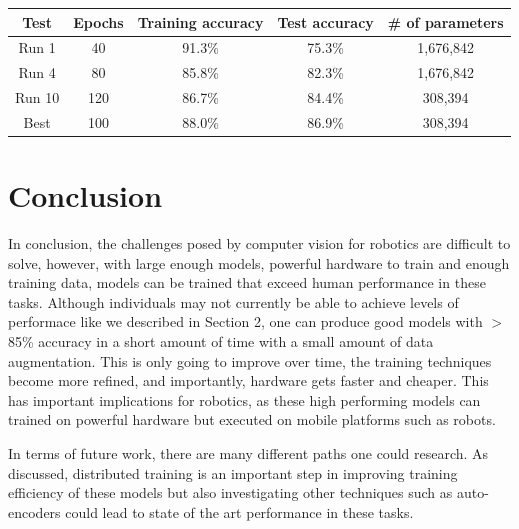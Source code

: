 \documentclass[12pt]{article}
\begin{document}
\begin{table}[htbp]
  \centering
  \begin{tabular}{|c|c|c|c|c|}
    \hline
    Test   & \multicolumn{1}{l|}{Epochs} & \multicolumn{1}{l|}{Training accuracy} & \multicolumn{1}{l|}{Test accuracy} & \multicolumn{1}{l|}{\# of parameters} \\ \hline
    Run 1  & 40                          & 91.3\%                                 & 75.3\%                             & 1,676,842                             \\ \hline
    Run 4  & 80                          & 85.8\%                                 & 82.3\%                             & 1,676,842                             \\ \hline
    Run 10 & 120                         & 86.7\%                                 & 84.4\%                             & 308,394                               \\ \hline
    Best   & 100                         & 88.0\%                                 & 86.9\%                             & 308,394                               \\ \hline
  \end{tabular}
\end{table}

\section{Conclusion}
In conclusion, the challenges posed by computer vision for robotics are difficult to solve, however, with large enough models, powerful hardware to train and enough training data, models can be trained that exceed human performance in these tasks. Although individuals may not currently be able to achieve levels of performace like we described in Section 2, one can produce good models with $>$85\% accuracy in a short amount of time with a small amount of data augmentation. This is only going to improve over time, the training techniques become more refined, and importantly, hardware gets faster and cheaper. This has important implications for robotics, as these high performing models can trained on powerful hardware but executed on mobile platforms such as robots.

In terms of future work, there are many different paths one could research. As discussed, distributed training is an important step in improving training efficiency of these models but also investigating other techniques such as auto-encoders could lead to state of the art performance in these tasks.

\nocite{*}



\end{document}
